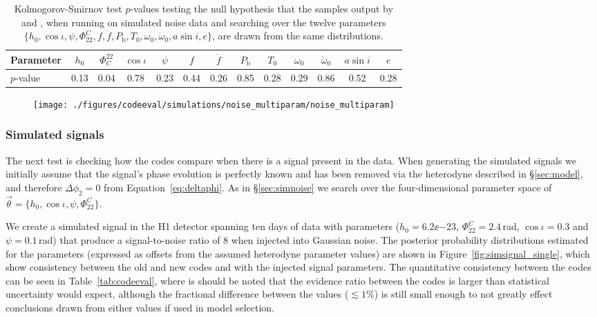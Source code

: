 \begin{table}[hptb]
\caption{Kolmogorov-Smirnov test $p$-values testing the null hypothesis that the samples output by \lppen and \lppe, when running on simulated
noise data and searching over the twelve parameters $\{h_0, \cos{\iota}, \psi, \Phi_{22}^C, f,\dot{f},P_{\text{b}}, T_0, \omega_0, \dot{\omega}_0, a\sin{i}, e\}$,
are drawn from the same distributions.\label{tab:noisemultiks}}
\begin{center}
\begin{tabular}{l | c c c c c c c c c c c c}
\hline
Parameter & $h_0$ & $\Phi_C^{22}$ & $\cos{\iota}$ & $\psi$ & $f$ & $\dot{f}$ & $P_{\text{b}}$ & $T_0$ & $\omega_0$ & $\dot{\omega}_0$ & $a\sin{i}$ & $e$ \\                      
\hline
\hline
$p$-value  & 0.13 & 0.04 & 0.78 & 0.23 & 0.44 & 0.26 & 0.85 & 0.28 & 0.29 & 0.86 & 0.52 & 0.28 \\
\hline
\end{tabular}
\end{center}
\end{table}

\begin{figure}[!phtb]
\begin{center}
\texttt{[image: ./figures/codeeval/simulations/noise\_multiparam/noise\_multiparam]}
\caption{ \protect}
\end{center}
\end{figure}

\subsubsection{Simulated signals}\label{sec:simsignal}

The next test is checking how the codes compare when there is a signal present in the data. When generating the simulated signals we initially
assume that the signal's phase evolution is perfectly known and has been removed via the heterodyne described in \S\ref{sec:model}, and therefore
$\Delta\phi_2 = 0$ from Equation~\ref{eq:deltaphi}. As in \S\ref{sec:simnoise} we search over the four-dimensional parameter space of
$\vec{\theta} = \{h_0, \cos{\iota}, \psi, \Phi_{22}^C\}$.

We create a simulated signal in the H1 detector spanning ten days of data with parameters ($h_0 = 6.2\ee{-23}$, $\Phi_{22}^C = 2.4$\,rad, $\cos{\iota} = 0.3$
and $\psi = 0.1$\,rad) that produce a signal-to-noise ratio of 8 when injected into
Gaussian noise. The posterior probability distributions estimated for the parameters (expressed as offsets from the assumed heterodyne parameter values) are
shown in Figure~\ref{fig:simsignal_single}, which show consistency
between the old and new codes and with the injected signal parameters. The quantitative consistency between the codes can be seen in Table~\ref{tab:codeeval},
where is should be noted that the evidence ratio between the codes is larger than statistical uncertainty would expect, although the fractional difference between
the values ($\lesssim 1\%$) is still small enough to not greatly effect conclusions drawn from either values if used in model selection.

